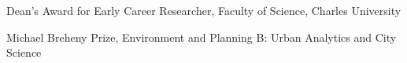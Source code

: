 \documentclass[11pt,a4paper]{report}
\begin{document}
    \begin{tablist}

        \item[2024] \tab{}Dean's Award for Early Career Researcher, Faculty of Science, Charles University
        \item[2023] \tab{}Michael Breheny Prize, Environment and Planning B: Urban Analytics and City Science

    \end{tablist}








\end{document}
